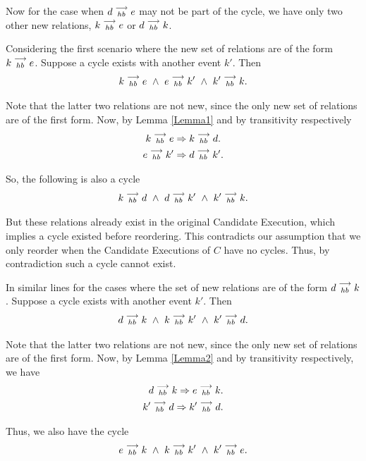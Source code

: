     Now for the case when $d\stackrel{\longrightarrow}{_{hb}}e$ may not be part of the cycle, we have only two other new relations, $k\stackrel{\longrightarrow}{_{hb}}e$ or $d\stackrel{\longrightarrow}{_{hb}}k$.

    Considering the first scenario where the new set of relations are of the form $k\stackrel{\longrightarrow}{_{hb}}e$. 
    Suppose a cycle exists with another event $k'$. Then 
    \[
        k\stackrel{\longrightarrow}{_{hb}}e \ \wedge \
        e\stackrel{\longrightarrow}{_{hb}}k' \ \wedge \
        k'\stackrel{\longrightarrow}{_{hb}}k.
    \]

    Note that the latter two relations are not new, since the only new set of relations are of the first form. Now, by Lemma \ref{Lemma1} and by transitivity respectively
    \begin{gather*}
        k\stackrel{\longrightarrow}{_{hb}}e \Rightarrow k\stackrel{\longrightarrow}{_{hb}}d. \\
        e\stackrel{\longrightarrow}{_{hb}}k' \Rightarrow d\stackrel{\longrightarrow}{_{hb}}k'.    
    \end{gather*}

    So, the following is also a cycle
    \[
        k\stackrel{\longrightarrow}{_{hb}}d \ \wedge \
        d\stackrel{\longrightarrow}{_{hb}}k' \ \wedge \
        k'\stackrel{\longrightarrow}{_{hb}}k.
    \]

    But these relations already exist in the original Candidate Execution, which implies a cycle existed before reordering. 
    This contradicts our assumption that we only reorder when the Candidate Executions of $C$ have no cycles. 
    Thus, by contradiction such a cycle cannot exist.

    In similar lines for the cases where the set of new relations are of the form $d\stackrel{\longrightarrow}{_{hb}}k$.
    Suppose a cycle exists with another event $k'$. Then 
    \begin{align*}
        \reln{d}{hb}{k} \ \wedge \
        \reln{k}{hb}{k'} \ \wedge \ 
        \reln{k'}{hb}{d}. 
    \end{align*}

    Note that the latter two relations are not new, since the only new set of relations are of the first form. 
    Now, by Lemma \ref{Lemma2} and by transitivity respectively, we have 
    \begin{align*}
        d\stackrel{\longrightarrow}{_{hb}}k \Rightarrow e\stackrel{\longrightarrow}{_{hb}}k. \\
        k'\stackrel{\longrightarrow}{_{hb}}d \Rightarrow k'\stackrel{\longrightarrow}{_{hb}}d.
    \end{align*}

    Thus, we also have the cycle 
    \begin{align*}
        \reln{e}{hb}{k} \ \wedge \
        \reln{k}{hb}{k'} \ \wedge \ 
        \reln{k'}{hb}{e}. 
    \end{align*}

